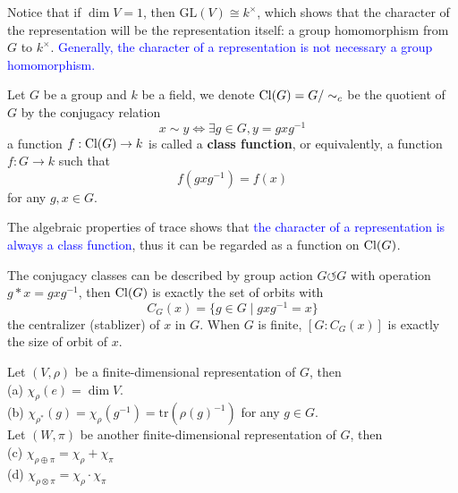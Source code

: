     Notice that if \(\dim V = 1\), then \(\mathrm{GL}(V) \cong k^\times\), which shows that the character of the representation will be the representation itself: a group homomorphism from \(G\) to \(k^\times\). \textcolor{blue}{Generally, the character of a representation is not necessary a group homomorphism.}


\begin{definition}
    Let \(G\) be a group and \(k\) be a field, we denote \(\operatorname{Cl}(G) = G/\sim_c\) be the quotient of \(G\) by the conjugacy relation
    \[x \sim y \iff \exists g \in G, y = gxg^{-1}\]
    a function \(f:\operatorname{Cl}(G) \to k\) is called a \textbf{class function}, or equivalently, a function \(f:G \to k\) such that 
    \[f(gxg^{-1}) = f(x)\]
    for any \(g,x \in G\).
\end{definition}

\begin{remark}
    The algebraic properties of trace shows that \textcolor{blue}{the character of a representation is always a class function}, thus it can be regarded as a function on \(\operatorname{Cl}(G)\).

    The conjugacy classes can be described by group action \(G \circlearrowleft G\) with operation \(g*x = gxg^{-1}\), then \(\operatorname{Cl}(G)\) is exactly the set of orbits with 
    \[C_G(x) = \{g \in G \mid gxg^{-1}= x\}\]
    the centralizer (stablizer) of \(x\) in \(G\). When \(G\) is finite, \([G:C_G(x)]\) is exactly the size of orbit of \(x\).
\end{remark}

\begin{proposition}
        Let \((V,\rho)\) be a finite-dimensional representation of \(G\), then \\
        (a) \(\chi_\rho(e) = \dim V\).\\ 
        (b) \(\chi_{\rho^*}(g) = \chi_\rho(g^{-1}) = \mathrm{tr}(\rho(g)^{-1})\) for any \(g \in G\).\\
        Let \((W,\pi)\) be another finite-dimensional representation of \(G\), then \\
        (c) \(\chi_{\rho \oplus \pi} = \chi_\rho + \chi_\pi\)\\
        (d) \(\chi_{\rho \otimes \pi} = \chi_{\rho} \cdot \chi_\pi\)
\end{proposition}